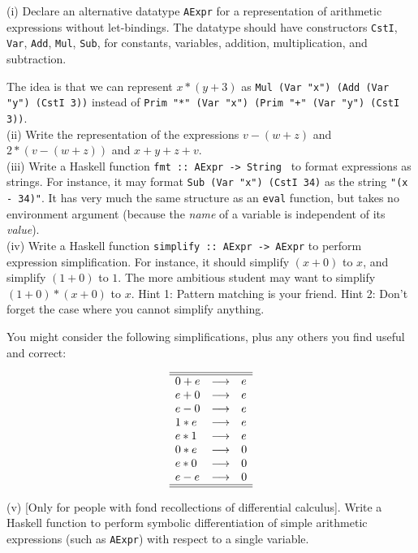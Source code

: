 \documentclass[a4paper]{article}
\begin{document}
\begin{exercise}\label{exer-aexpr-datatype}
  (i) Declare an alternative datatype \texttt{AExpr} for a
representation of arithmetic expressions without let-bindings.  The
datatype should have constructors \texttt{CstI}, \texttt{Var},
\texttt{Add}, \texttt{Mul}, \texttt{Sub}, for constants, variables,
addition, multiplication, and subtraction.
  
The idea is that we can represent $x*(y+3)$ as \texttt{Mul (Var "x")
  (Add (Var "y") (CstI 3))} instead of \texttt{Prim "*" (Var "x")
  (Prim "+" (Var "y") (CstI 3))}.\\

\noindent
(ii) Write the representation of the expressions $v-(w+z)$ and
$2*(v-(w+z))$ and $x+y+z+v$.\\

\noindent
(iii) Write a Haskell function \texttt{fmt ::\ AExpr -> String } to format
expressions as strings.  For instance, it may format \texttt{Sub (Var
  "x") (CstI 34)} as the string \texttt{"(x - 34)"}.  It has very much
the same structure as an \texttt{eval} function, but takes no
environment argument (because the \emph{name} of a variable is
independent of its \emph{value}).\\

\noindent
(iv) Write a Haskell function \texttt{simplify ::\ AExpr -> AExpr} to
perform expression simplification.  For instance, it should simplify
$(x+0)$ to $x$, and simplify $(1+0)$ to $1$.  The more ambitious
student may want to simplify $(1+0)*(x+0)$ to $x$.  Hint 1: Pattern
matching is your friend.  Hint 2: Don't forget the case where you
cannot simplify anything.

You might consider the following simplifications, plus any others you
find useful and correct:

\begin{displaymath}
  \begin{array}{lcl}\hline\hline
    0 + e & \longrightarrow & e\\
    e + 0 & \longrightarrow & e\\
    e - 0 & \longrightarrow & e\\
    1 * e & \longrightarrow & e\\
    e * 1 & \longrightarrow & e\\
    0 * e & \longrightarrow & 0\\
    e * 0 & \longrightarrow & 0\\
    e - e & \longrightarrow & 0\\\hline\hline
  \end{array}
\end{displaymath}

\noindent
(v) [Only for people with fond recollections of differential
calculus].  Write a Haskell function to perform symbolic differentiation
of simple arithmetic expressions (such as \texttt{AExpr}) with respect
to a single variable.\\
\end{exercise}
\end{document}
